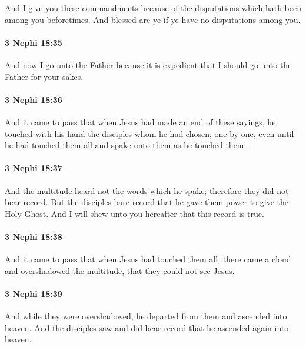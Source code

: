 			And I give you these commandments
			because of the disputations which hath been among you beforetimes.
			And blessed are ye if ye have no disputations among you.

		\paragraph{3 Nephi 18:35} %
			\label{3NEPHI-18-35}

			And now I go unto the Father
			because it is expedient that I should go unto the Father for your sakes.

		\paragraph{3 Nephi 18:36} %
			\label{3NEPHI-18-36}

			And it came to pass that when Jesus had made an end of these sayings,
			he touched with his hand the disciples whom he had chosen, one by one,
			even until he had touched them all
			and spake unto them as he touched them.

		\paragraph{3 Nephi 18:37} %
			\label{3NEPHI-18-37}

			And the multitude heard not the words which he spake;
			therefore they did not bear record.
			But the disciples bare record
			that he gave them power to give the Holy Ghost.
			And I will shew unto you hereafter that this record is true.

		\paragraph{3 Nephi 18:38} %
			\label{3NEPHI-18-38}

			And it came to pass that when Jesus had touched them all,
			there came a cloud and overshadowed the multitude,
			that they could not see Jesus.

		\paragraph{3 Nephi 18:39} %
			\label{3NEPHI-18-39}

			And while they were overshadowed,
			he departed from them and ascended into heaven.
			And the disciples saw and did bear record
			that he ascended again into heaven.

